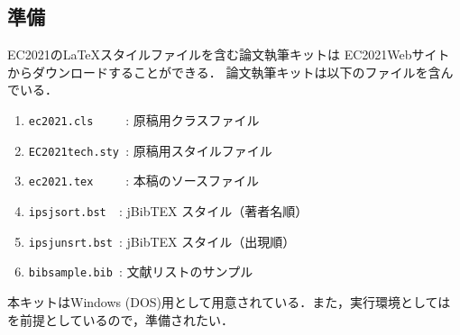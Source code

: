 \documentclass[submit,techreq,noauthor]{ec2021}
\def\|{\verb|}
\begin{document}
\subsection{準備}
EC2021の\LaTeX スタイルファイルを含む論文執筆キットは
%情報処理学会論文誌ジャーナルの \LaTeX スタイルファイルを含む論文執筆キッ
%トは
%\begin{quote}
%\small
%\|http://www.ipsj.or.jp/jip/submit/style.html|
EC2021Webサイトからダウンロードすることができる．
論文執筆キットは以下のファイルを含んでいる．
\begin{enumerate}
\item \|ec2021.cls     |: 原稿用クラスファイル
\item \|EC2021tech.sty |: 原稿用スタイルファイル
\item \|ec2021.tex     |: 本稿のソースファイル
\item \|ipsjsort.bst  |: jBibTEX スタイル（著者名順）
\item \|ipsjunsrt.bst |: jBibTEX スタイル（出現順）
\item \|bibsample.bib |: 文献リストのサンプル
\end{enumerate}
本キットはWindows (DOS)用として用意されている．また，実行環境としては 
\LaTeXe を前提としているので，準備されたい．





\end{document}
